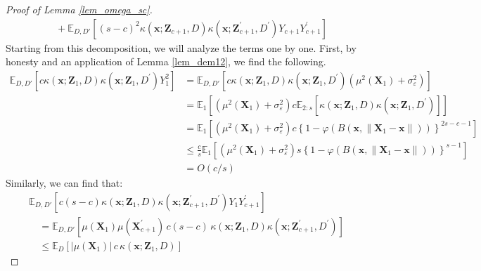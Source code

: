 \documentclass[letterpaper,10pt]{article}
\numberwithin{equation}{section}
\numberwithin{thm}{section}
\numberwithin{lem}{section}
\numberwithin{cor}{section}
\newcommand{\E}{\mathbb{E}}
\newcommand{\1}{\mathbbm{1}}
\begin{document}
\begin{proof}[Proof of Lemma \ref{lem_omega_sc}]
\begin{equation}
\begin{aligned}
			 & \quad + \E_{D, D'}\left[(s-c)^2 \kappa\left(\mathbf{x}; \mathbf{Z}_{c+1}, D\right)\kappa\left(\mathbf{x}; \mathbf{Z}_{c+1}^{\prime}, D^{\prime}\right)Y_{c+1}Y_{c+1}^{\prime}\right]
		\end{aligned}
	\end{equation}
	Starting from this decomposition, we will analyze the terms one by one.
	First, by honesty and an application of Lemma \ref{lem_dem12}, we find the following.
	\begin{equation}
		\begin{aligned}
			\E_{D, D'}\left[c\kappa\left(\mathbf{x}; \mathbf{Z}_{1}, D\right)\kappa\left(\mathbf{x}; \mathbf{Z}_{1}, D^{\prime}\right)Y_{1}^{2}\right]
			 & = \E_{D, D'}\left[c\kappa\left(\mathbf{x}; \mathbf{Z}_{1}, D\right)\kappa\left(\mathbf{x}; \mathbf{Z}_{1}, D^{\prime}\right)\left(\mu^2(\mathbf{X}_1) + \sigma_{\varepsilon}^{2}\right)\right]                   \\
			 & = \E_{1}\left[\left(\mu^2(\mathbf{X}_1) + \sigma_{\varepsilon}^{2}\right) c\E_{2:s}\left[\kappa\left(\mathbf{x}; \mathbf{Z}_{1}, D\right)\kappa\left(\mathbf{x}; \mathbf{Z}_{1}, D^{\prime}\right)\right]\right] \\
			 & = \E_{1}\left[\left(\mu^2(\mathbf{X}_1) + \sigma_{\varepsilon}^{2}\right) c\left\{1 - \varphi\left(B\left(\mathbf{x}, \|\mathbf{X}_1 - \mathbf{x}\|\right)\right)\right\}^{2s-c-1}\right]                        \\
			 & \leq \frac{c}{s} \E_{1}\left[\left(\mu^2(\mathbf{X}_1) + \sigma_{\varepsilon}^{2}\right) s\left\{1 - \varphi\left(B\left(\mathbf{x}, \|\mathbf{X}_1 - \mathbf{x}\|\right)\right)\right\}^{s-1}\right]            \\
			 & = O(c/s)
		\end{aligned}
	\end{equation}
	Similarly, we can find that:
	\begin{equation}
		\begin{aligned}
			 & \E_{D, D'}\left[c(s-c) \kappa\left(\mathbf{x}; \mathbf{Z}_{1}, D\right)\kappa\left(\mathbf{x}; \mathbf{Z}_{c+1}^{\prime}, D^{\prime}\right)Y_{1}Y_{c+1}^{\prime}\right]                                          \\
			 & \quad = \E_{D, D'}\left[\mu(\mathbf{X}_1)\mu(\mathbf{X}_{c+1}^{\prime}) \, c(s-c) \, \kappa\left(\mathbf{x}; \mathbf{Z}_{1}, D\right)\kappa\left(\mathbf{x}; \mathbf{Z}_{c+1}^{\prime}, D^{\prime}\right)\right] \\
			 & \quad \leq \E_{D}\left[|\mu(\mathbf{X}_1)| \, c \, \kappa\left(\mathbf{x}; \mathbf{Z}_{1}, D\right)\right]

\end{aligned}
\end{equation}
\end{proof}
\end{document}
